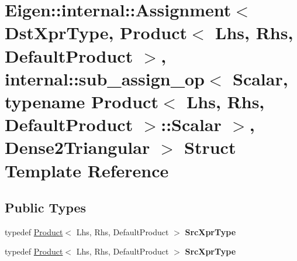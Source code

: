 \hypertarget{struct_eigen_1_1internal_1_1_assignment_3_01_dst_xpr_type_00_01_product_3_01_lhs_00_01_rhs_00_01bb8efed27d47832b53496ca7f6c9254b}{}\section{Eigen\+:\+:internal\+:\+:Assignment$<$ Dst\+Xpr\+Type, Product$<$ Lhs, Rhs, Default\+Product $>$, internal\+:\+:sub\+\_\+assign\+\_\+op$<$ Scalar, typename Product$<$ Lhs, Rhs, Default\+Product $>$\+:\+:Scalar $>$, Dense2\+Triangular $>$ Struct Template Reference}
\label{struct_eigen_1_1internal_1_1_assignment_3_01_dst_xpr_type_00_01_product_3_01_lhs_00_01_rhs_00_01bb8efed27d47832b53496ca7f6c9254b}
\subsection*{Public Types}
\begin{DoxyCompactItemize}
\item 
\mbox{\label{struct_eigen_1_1internal_1_1_assignment_3_01_dst_xpr_type_00_01_product_3_01_lhs_00_01_rhs_00_01bb8efed27d47832b53496ca7f6c9254b_afaf3ea3984def04214841fd080dedbb6}} 
typedef \hyperlink{group___core___module_class_eigen_1_1_product}{Product}$<$ Lhs, Rhs, Default\+Product $>$ {\bfseries Src\+Xpr\+Type}
\item 
\mbox{\label{struct_eigen_1_1internal_1_1_assignment_3_01_dst_xpr_type_00_01_product_3_01_lhs_00_01_rhs_00_01bb8efed27d47832b53496ca7f6c9254b_afaf3ea3984def04214841fd080dedbb6}} 
typedef \hyperlink{group___core___module_class_eigen_1_1_product}{Product}$<$ Lhs, Rhs, Default\+Product $>$ {\bfseries Src\+Xpr\+Type}
\end{DoxyCompactItemize}
